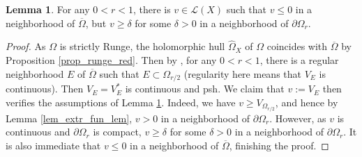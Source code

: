 \documentclass[12pt]{article}
\numberwithin{equation}{section}
\theoremstyle{theorem}
\theoremstyle{definition}
\newtheorem{lem}[thm]{Lemma}
\theoremstyle{remark}
\begin{document}
	\begin{lem}\label{lem_extr_fun_lem2}
		For any $0 < r < 1$, there is $v \in \mathscr{L}(X)$ such that $v \leq 0$ in a neighborhood of $\overline{\Omega}$, but $v \geq \delta$ for some $\delta > 0$ in a neighborhood of $\partial \Omega_r$.
	\end{lem}
	\begin{proof}
		As $\Omega$ is strictly Runge, the holomorphic hull $\widehat{\Omega}_X$ of $\Omega$ coincides with $\overline{\Omega}$ by Proposition \ref{prop_runge_red}.
		Then by \cite[Theorem 3.16]{ZeriahiSic}, for any $0 < r < 1$, there is a regular neighborhood $E$ of $\overline{\Omega}$ such that $E \subset \Omega_{r/2}$ (regularity here means that $V_E$ is continuous).
		Then $V_E = V_E^*$ is continuous and psh.
		We claim that $v := V_E$ then verifies the assumptions of Lemma \ref{lem_extr_fun_lem2}.
		Indeed, we have $v \geq V_{\Omega_{r/2}}$, and hence by Lemma \ref{lem_extr_fun_lem}, $v > 0$ in a neighborhood of $\partial \Omega_r$.
		However, as $v$ is continuous and $\partial \Omega_r$ is compact, $v \geq \delta$ for some $\delta > 0$ in a neighborhood of $\partial \Omega_r$.
		It is also immediate that $v \leq 0$ in a neighborhood of $\overline{\Omega}$, finishing the proof.
	\end{proof}
\end{document}
